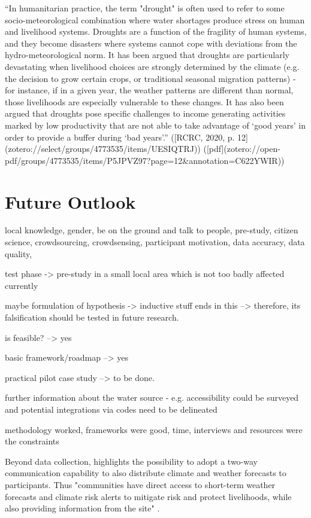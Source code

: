 “In humanitarian practice, the term "drought" is often used to refer to some socio-meteorological combination where water shortages produce stress on human and livelihood systems. Droughts are a function of the fragility of human systems, and they become disasters where systems cannot cope with deviations from the hydro-meteorological norm. It has been argued that droughts are particularly devastating when livelihood choices are strongly determined by the climate (e.g. the decision to grow certain crops, or traditional seasonal migration patterns) - for instance, if in a given year, the weather patterns are different than normal, those livelihoods are especially vulnerable to these changes. It has also been argued that droughts pose specific challenges to income generating activities marked by low productivity that are not able to take advantage of ‘good years’ in order to provide a buffer during ‘bad years’.” ([RCRC, 2020, p. 12](zotero://select/groups/4773535/items/UESIQTRJ)) ([pdf](zotero://open-pdf/groups/4773535/items/P5JPVZ97?page=12&annotation=C622YWIR))


\section{Future Outlook}

local knowledge, gender, be on the ground and talk to people, pre-study, citizen science, crowdsourcing, crowdsensing, participant motivation, data accuracy, data quality,

test phase -> pre-study in a small local area which is not too badly affected currently 


maybe formulation of hypothesis -> inductive stuff ends in this --> therefore, its falsification should be tested in future research.


is feasible? --> yes

basic framework/roadmap --> yes

practical pilot case study --> to be done.


further information about the water source - e.g. accessibility could be surveyed and potential integrations via codes need to be delineated


methodology worked, frameworks were good, time, interviews and resources were the constraints



Beyond data collection, \autocite{gualazziniEWEAEarlyWarning2021} highlights the possibility to adopt a two-way communication capability to also distribute climate and weather forecasts to participants. Thus "communities have direct access to short-term weather forecasts and climate risk alerts to mitigate risk and protect livelihoods, while also providing information from the site" \autocite[20]{gualazziniEWEAEarlyWarning2021}. %